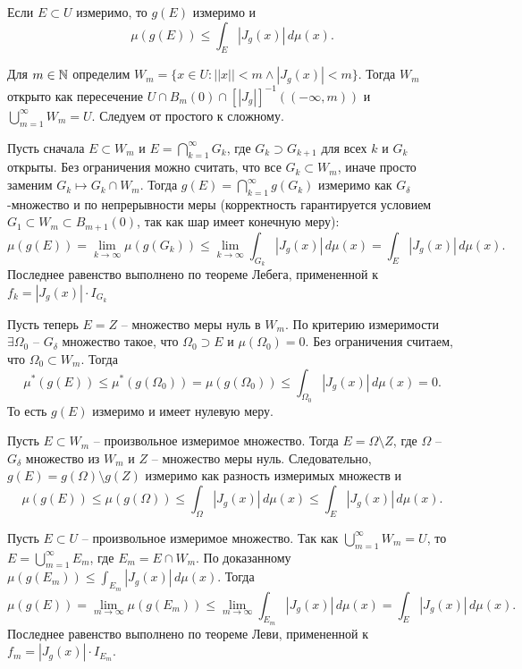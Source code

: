 \begin{lemma}
	Если $E \subset U$ измеримо, то $g(E)$ измеримо и 
	\[ \mu(g(E)) \leq \int_{E} |J_g(x)| \, d\mu (x). \]
\end{lemma}

 \begin{myproof}
	Для $m \in \mathbb{N}$ определим $W_m = \{x \in U : ||x|| < m \wedge |J_g(x)| < m\}$. 
	Тогда $W_m$ открыто как пересечение $U \cap B_{m}(0) \cap [|J_g|]^{-1}((-\infty, m))$ и $\bigcup \limits_{m=1}^{\infty} W_m = U$. 
	Следуем от простого к сложному.

	Пусть сначала $E \subset W_m$ и $E = \bigcap \limits_{k = 1}^{\infty} G_k$, где $G_k \supset G_{k+1}$ для всех $k$ и $G_k$ открыты. 
	Без ограничения можно считать, что все $G_k \subset W_m$, иначе просто заменим $G_k \mapsto G_k \cap W_m$. 
	Тогда $g(E) = \bigcap \limits_{k=1}^{\infty} g(G_k)$ измеримо как $G_{\delta}$-множество и по непрерывности меры (корректность гарантируется условием $G_1 \subset W_m \subset B_{m+1}(0)$, так как шар имеет конечную меру):
	\[ \mu(g(E)) = \lim \limits_{k \to \infty} \mu(g(G_k)) \leq \lim \limits_{k \to \infty} \int_{G_k} |J_g(x)| \, d\mu(x) = \int_{E} |J_g(x)| \, d\mu(x). \]
	Последнее равенство выполнено по теореме Лебега, примененной к $f_k = |J_g(x)|\cdot I_{G_k}$

	\vspace{5pt}
	Пусть теперь $E = Z$ -- множество меры нуль в $W_m$. По критерию измеримости $\exists \Omega_0$ -- $G_{\delta}$ множество такое, что $\Omega_0 \supset E$ и $\mu(\Omega_0) = 0$. 
	Без ограничения считаем, что $\Omega_0 \subset W_m$. Тогда 
	\[ \mu^*(g(E)) \leq \mu^*(g(\Omega_0)) = \mu(g(\Omega_0)) \leq \int_{\Omega_0} |J_g(x)| \, d\mu(x) = 0. \]
	То есть $g(E)$ измеримо и имеет нулевую меру.

	\vspace{5pt}
	Пусть $E \subset W_m$ -- произвольное измеримое множество. Тогда $E = \Omega \setminus Z$, где 
	$\Omega$ -- $G_{\delta}$ множество из $W_m$ и $Z$ -- множество меры нуль. 
	Следовательно, $g(E) = g(\Omega) \setminus g(Z)$ измеримо как разность измеримых множеств и
	\[ \mu(g(E)) \leq \mu(g(\Omega)) \leq \int_{\Omega} |J_g(x)| \, d\mu(x) \leq \int_{E} |J_g(x)| \, d\mu(x). \]

	Пусть $E \subset U$ -- произвольное измеримое множество. Так как $\bigcup \limits_{m=1}^{\infty} W_m = U$, то $E = \bigcup \limits_{m=1}^{\infty} E_m$, где $E_m = E \cap W_m$. 
	По доказанному $\mu(g(E_m)) \leq \int_{E_m} |J_g(x)| \, d\mu(x)$. 
	Тогда 
	\[ \mu(g(E)) = \lim \limits_{m \to \infty} \mu(g(E_m)) \leq \lim \limits_{m \to \infty} \int_{E_m} |J_g(x)| \, d\mu(x) = \int_{E} |J_g(x)|\, d\mu(x). \] 
	Последнее равенство выполнено по теореме Леви, примененной к $f_m = |J_g(x)|\cdot I_{E_m}$.
 \end{myproof}


